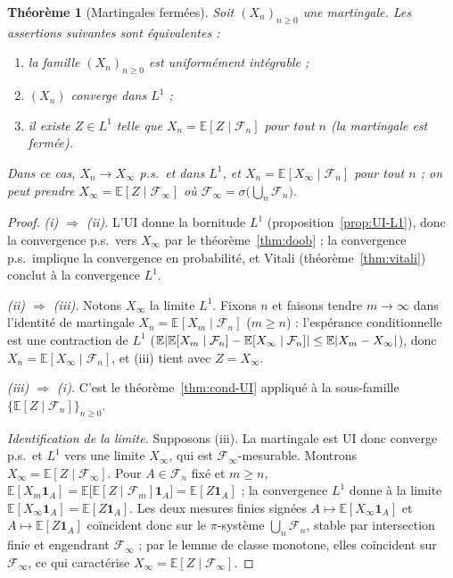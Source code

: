 \documentclass[11pt,a4paper]{article}
\theoremstyle{plain}
\newtheorem{theorem}{Théorème}[section]
\theoremstyle{definition}
\theoremstyle{remark}
\newcommand{\E}{\mathbb{E}}
\newcommand{\F}{\mathcal{F}}
\newcommand{\ind}{\mathbf{1}}
\DeclarePairedDelimiter{\abs}{\lvert}{\rvert}
\begin{document}
\begin{theorem}[Martingales fermées]\label{thm:fermee}
Soit $(X_n)_{n\ge0}$ une martingale. Les assertions suivantes sont
équivalentes :
\begin{enumerate}[label=(\roman*)]
\item la famille $(X_n)_{n \ge 0}$ est uniformément intégrable ;
\item $(X_n)$ converge dans $L^1$ ;
\item il existe $Z \in L^1$ telle que $X_n = \E[Z \mid \F_n]$ pour tout $n$
      (la martingale est \emph{fermée}).
\end{enumerate}
Dans ce cas, $X_n \to X_\infty$ p.s.\ et dans $L^1$, et
$X_n = \E[X_\infty \mid \F_n]$ pour tout $n$ ; on peut prendre
$X_\infty = \E[Z \mid \F_\infty]$ où $\F_\infty = \sigma\bigl(\bigcup_n
\F_n\bigr)$.
\end{theorem}

\begin{proof}
\emph{(i) $\Rightarrow$ (ii).} L'UI donne la bornitude $L^1$
(proposition~\ref{prop:UI-L1}), donc la convergence p.s.\ vers $X_\infty$ par le
théorème~\ref{thm:doob} ; la convergence p.s.\ implique la convergence en
probabilité, et Vitali (théorème~\ref{thm:vitali}) conclut à la convergence
$L^1$.

\emph{(ii) $\Rightarrow$ (iii).} Notons $X_\infty$ la limite $L^1$. Fixons $n$
et faisons tendre $m \to \infty$ dans l'identité de martingale
$X_n = \E[X_m \mid \F_n]$ ($m \ge n$) : l'espérance conditionnelle est une
contraction de $L^1$
($\E\abs{\E[X_m \mid \F_n] - \E[X_\infty \mid \F_n]} \le \E\abs{X_m -
X_\infty}$), donc $X_n = \E[X_\infty \mid \F_n]$, et (iii) tient avec
$Z = X_\infty$.

\emph{(iii) $\Rightarrow$ (i).} C'est le théorème~\ref{thm:cond-UI} appliqué à
la sous-famille $\{\E[Z\mid\F_n]\}_{n\ge0}$.

\emph{Identification de la limite.} Supposons (iii). La martingale est UI donc
converge p.s.\ et $L^1$ vers une limite $X_\infty$, qui est
$\F_\infty$-mesurable. Montrons $X_\infty = \E[Z \mid \F_\infty]$. Pour
$A \in \F_n$ fixé et $m \ge n$,
$\E[X_m \ind_A] = \E\bigl[\E[Z\mid\F_m]\ind_A\bigr] = \E[Z\ind_A]$ ; la
convergence $L^1$ donne à la limite $\E[X_\infty \ind_A] = \E[Z \ind_A]$. Les
deux mesures finies signées $A \mapsto \E[X_\infty\ind_A]$ et
$A \mapsto \E[Z\ind_A]$ coïncident donc sur le $\pi$-système
$\bigcup_n \F_n$, stable par intersection finie et engendrant $\F_\infty$ ; par
le lemme de classe monotone, elles coïncident sur $\F_\infty$, ce qui
caractérise $X_\infty = \E[Z\mid\F_\infty]$.
\end{proof}
\end{document}
